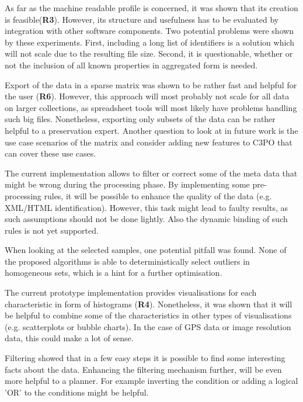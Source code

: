 As far as the machine readable profile is concerned, it was shown that its creation is feasible(\textbf{R3}). However, its structure and usefulness has to be evaluated by integration with other software components. Two potential problems were shown by these experiments. First, including a long list of identifiers is a solution which will not scale due to the resulting file size.
Second, it is questionable, whether or not the inclusion of all known properties in aggregated form is needed.

Export of the data in a sparse matrix was shown to be rather fast and helpful for the user (\textbf{R6}). However, this approach will most probably not scale for all data on larger collections, as spreadsheet tools will most likely have problems handling such big files. Nonetheless, exporting only subsets of the data can be rather helpful to a preservation
expert. Another question to look at in future work is the use case scenarios of the matrix and consider adding new features to C3PO that can cover these use cases.

The current implementation allows to filter or correct some of the meta data that might be wrong during the processing phase. By implementing some pre-processing rules, it will be possible to enhance the quality of the data (e.g. XML/HTML identification). However, this task might lead to faulty results, as such assumptions should not be done lightly. Also the dynamic binding of such rules is not yet supported.

When looking at the selected samples, one potential pitfall was found. None of the proposed algorithms is able to deterministically select outliers in homogeneous sets, which is a hint for a further optimisation.

The current prototype implementation provides visualisations for each characteristic in form of histograms (\textbf{R4}). Nonetheless, it was shown that it will be helpful to combine some of the characteristics in other types of visualisations (e.g. scatterplots or bubble charts). In the case of GPS data or image resolution data, this could make a lot of sense.

Filtering showed that in a few easy steps it is possible to find some interesting facts about the data. Enhancing the filtering mechanism further, will be even more helpful to a planner. For example inverting the condition or adding a logical 'OR' to the conditions might be helpful.